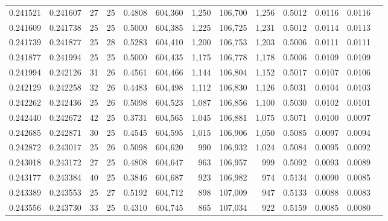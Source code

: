 \begin{tabular}{rrrrrrrrrrrrr}
0.241521 & 0.241607 &  27 &  25 &                                     0.4808 & 604,360 &   1,250 & 106,700 &   1,256 & 0.5012 & 0.0116 & 0.0116 \\
0.241609 & 0.241738 &  25 &  25 &                                     0.5000 & 604,385 &   1,225 & 106,725 &   1,231 & 0.5012 & 0.0114 & 0.0113 \\
0.241739 & 0.241877 &  25 &  28 &                                     0.5283 & 604,410 &   1,200 & 106,753 &   1,203 & 0.5006 & 0.0111 & 0.0111 \\
0.241877 & 0.241994 &  25 &  25 &                                     0.5000 & 604,435 &   1,175 & 106,778 &   1,178 & 0.5006 & 0.0109 & 0.0109 \\
0.241994 & 0.242126 &  31 &  26 &                                     0.4561 & 604,466 &   1,144 & 106,804 &   1,152 & 0.5017 & 0.0107 & 0.0106 \\
0.242129 & 0.242258 &  32 &  26 &                                     0.4483 & 604,498 &   1,112 & 106,830 &   1,126 & 0.5031 & 0.0104 & 0.0103 \\
0.242262 & 0.242436 &  25 &  26 &                                     0.5098 & 604,523 &   1,087 & 106,856 &   1,100 & 0.5030 & 0.0102 & 0.0101 \\
0.242440 & 0.242672 &  42 &  25 &                                     0.3731 & 604,565 &   1,045 & 106,881 &   1,075 & 0.5071 & 0.0100 & 0.0097 \\
0.242685 & 0.242871 &  30 &  25 &                                     0.4545 & 604,595 &   1,015 & 106,906 &   1,050 & 0.5085 & 0.0097 & 0.0094 \\
0.242872 & 0.243017 &  25 &  26 &                                     0.5098 & 604,620 &     990 & 106,932 &   1,024 & 0.5084 & 0.0095 & 0.0092 \\
0.243018 & 0.243172 &  27 &  25 &                                     0.4808 & 604,647 &     963 & 106,957 &     999 & 0.5092 & 0.0093 & 0.0089 \\
0.243177 & 0.243384 &  40 &  25 &                                     0.3846 & 604,687 &     923 & 106,982 &     974 & 0.5134 & 0.0090 & 0.0085 \\
0.243389 & 0.243553 &  25 &  27 &                                     0.5192 & 604,712 &     898 & 107,009 &     947 & 0.5133 & 0.0088 & 0.0083 \\
0.243556 & 0.243730 &  33 &  25 &                                     0.4310 & 604,745 &     865 & 107,034 &     922 & 0.5159 & 0.0085 & 0.0080 \\

\end{tabular}
